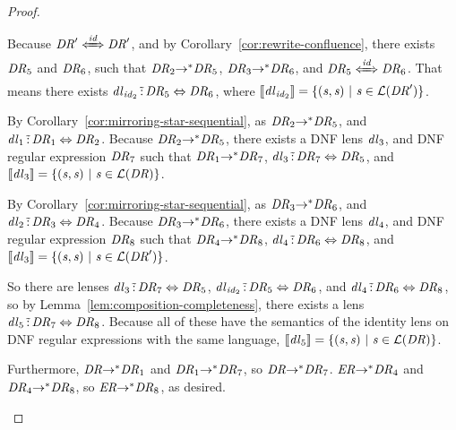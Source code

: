 \documentclass[numbers,10pt,preprint\ifanon ,nocopyrightspace\fi]{sigplanconf}
\begin{document}
\begin{proof}
\begin{case}[\TransitivityRule{}]
    Because $\SatisfiesIdentitySemantics{\DNFRegex'}{\DNFRegex'}$, and
    by Corollary~\ref{cor:rewrite-confluence}, there exists $\mathit{DR}_5$ and
    $\mathit{DR}_6$, such that
    $\mathit{DR}_2 {\rightarrow}^* \mathit{DR}_5$,
    $\mathit{DR}_3 {\rightarrow}^* \mathit{DR}_6$, and
    $\SatisfiesIdentitySemantics{\DNFRegex_5}{\DNFRegex_6}$.
    That means there exists
    $\mathit{dl}_{\mathit{id}_2} \,\tilde{:}\,
    \mathit{DR}_5 \Leftrightarrow \mathit{DR}_6$, where
    $[ \! [\mathit{dl}_{\mathit{id}_2}] \! ] = \{(\mathit{s},\mathit{s}) ~|~
      \mathit{s} \in \mathcal{L}(\mathit{DR}')\}$.

    By Corollary~\ref{cor:mirroring-star-sequential},
    as $\mathit{DR}_2 {\rightarrow}^* \mathit{DR}_5$, and
    $\mathit{dl}_1 \,\tilde{:}\, \mathit{DR}_1 \Leftrightarrow \mathit{DR}_2$.
    Because $\mathit{DR}_2 {\rightarrow}^* \mathit{DR}_5$, there exists a
    DNF lens $\mathit{dl}_3$, and DNF regular expression $\mathit{DR}_7$ such that
    $\mathit{DR}_1 {\rightarrow}^* \mathit{DR}_7$, $\mathit{dl}_3 \,\tilde{:}\,
    \mathit{DR}_7 \Leftrightarrow \mathit{DR}_5$, and
    $[ \! [\mathit{dl}_3] \! ] =
    \{(\mathit{s},\mathit{s}) ~|~ \mathit{s} \in \mathcal{L}(\mathit{DR})\}$.

    By Corollary~\ref{cor:mirroring-star-sequential},
    as $\mathit{DR}_3 {\rightarrow}^* \mathit{DR}_6$, and
    $\mathit{dl}_2 \,\tilde{:}\, \mathit{DR}_3 \Leftrightarrow \mathit{DR}_4$.
    Because $\mathit{DR}_3 {\rightarrow}^* \mathit{DR}_6$, there exists a
    DNF lens $\mathit{dl}_4$, and DNF regular expression $\mathit{DR}_8$ such that
    $\mathit{DR}_4 {\rightarrow}^* \mathit{DR}_8$, $\mathit{dl}_4 \,\tilde{:}\,
    \mathit{DR}_6 \Leftrightarrow \mathit{DR}_8$, and
    $[ \! [\mathit{dl}_3] \! ] =
    \{(\mathit{s},\mathit{s}) ~|~ \mathit{s} \in \mathcal{L}(\mathit{DR}')\}$.

    So there are lenses
    $\mathit{dl}_3 \,\tilde{:}\, \mathit{DR}_7 \Leftrightarrow \mathit{DR}_5$,
    $\mathit{dl}_{\mathit{id}_2} \,\tilde{:}\, \mathit{DR}_5 \Leftrightarrow \mathit{DR}_6$, and
    $\mathit{dl}_4 \,\tilde{:}\, \mathit{DR}_6 \Leftrightarrow \mathit{DR}_8$, so
    by Lemma~\ref{lem:composition-completeness}, there exists a lens
    $\mathit{dl}_5 \,\tilde{:}\, \mathit{DR}_7 \Leftrightarrow \mathit{DR}_8$.
    Because all of these have the semantics of the identity lens on DNF regular
    expressions with the same language,
    $[ \! [\mathit{dl}_5] \! ] =
    \{(\mathit{s},\mathit{s}) ~|~ \mathit{s} \in \mathcal{L}(\mathit{DR})\}$.

    Furthermore, $\mathit{DR} {\rightarrow}^* \mathit{DR}_1$ and
    $\mathit{DR}_1 {\rightarrow}^* \mathit{DR}_7$, so
    $\mathit{DR} {\rightarrow}^* \mathit{DR}_7$.
    $\mathit{ER} {\rightarrow}^* \mathit{DR}_4$ and
    $\mathit{DR}_4 {\rightarrow}^* \mathit{DR}_8$, so
    $\mathit{ER} {\rightarrow}^* \mathit{DR}_8$, as desired.
  \end{case}
\end{proof}
\end{document}
